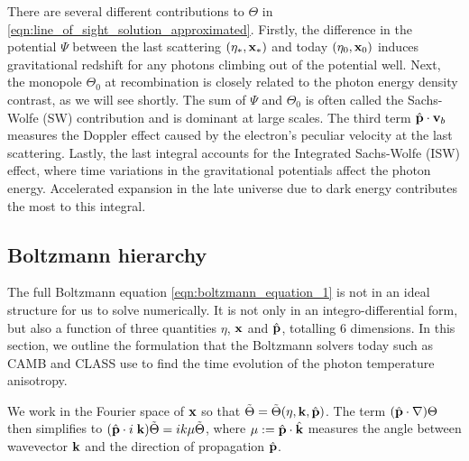 There are several different contributions to $\Theta$ in \eqref{eqn:line_of_sight_solution_approximated}. Firstly, the difference in the potential $\Psi$ between the last scattering $(\eta_*,\mathbf{x}_*)$ and today $(\eta_0, \mathbf{x}_0)$ induces gravitational redshift for any photons climbing out of the potential well. Next, the monopole $\Theta_0$ at recombination is closely related to the photon energy density contrast, as we will see shortly. The sum of $\Psi$ and $\Theta_0$ is often called the Sachs-Wolfe (SW) contribution and is dominant at large scales. The third term $\hat{\mathbf{p}}\cdot\mathbf{v}_b$ measures the Doppler effect caused by the electron's peculiar velocity at the last scattering. Lastly, the last integral accounts for the Integrated Sachs-Wolfe (ISW) effect, where time variations in the gravitational potentials affect the photon energy. Accelerated expansion in the late universe due to dark energy contributes the most to this integral.


\subsection{Boltzmann hierarchy} \label{section:boltzmann_hierarchy}

The full Boltzmann equation \eqref{eqn:boltzmann_equation_1} is not in an ideal structure for us to solve numerically. It is not only in an integro-differential form, but also a function of three quantities $\eta$, $\mathbf{x}$ and $\hat{\mathbf{p}}$, totalling 6 dimensions. In this section, we outline the formulation that the Boltzmann solvers today such as CAMB \cite{Lewis2000} and CLASS \cite{Blas2011class} use to find the time evolution of the photon temperature anisotropy.

We work in the Fourier space of $\mathbf{x}$ so that $\tilde{\Theta} = \tilde{\Theta}(\eta,\mathbf{k},\hat{\mathbf{p}})$. The term $(\hat{\mathbf{p}}\cdot\nabla)\Theta$ then simplifies to $(\hat{\mathbf{p}}\cdot i\;\mathbf{k})\tilde{\Theta} = ik\mu\tilde{\Theta}$, where $\mu := \hat{\mathbf{p}} \cdot \hat{\mathbf{k}}$ measures the angle between wavevector $\mathbf{k}$ and the direction of propagation $\hat{\mathbf{p}}$.

